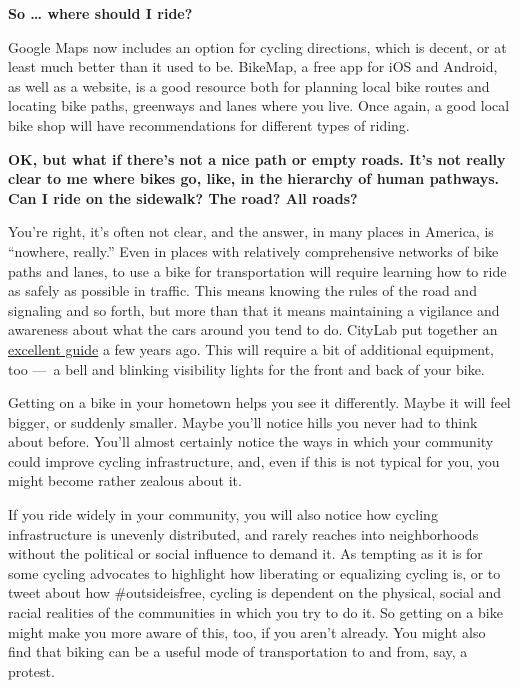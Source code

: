 \textbf{So \ldots{} where should I ride?}

Google Maps now includes an option for cycling directions, which is
decent, or at least much better than it used to be. BikeMap, a free app
for iOS and Android, as well as a website, is a good resource both for
planning local bike routes and locating bike paths, greenways and lanes
where you live. Once again, a good local bike shop will have
recommendations for different types of riding.

\textbf{OK, but what if there's not a nice path or empty roads. It's not
really clear to me where bikes go, like, in the hierarchy of human
pathways. Can I ride on the sidewalk? The road? All roads?}

You're right, it's often not clear, and the answer, in many places in
America, is ``nowhere, really.'' Even in places with relatively
comprehensive networks of bike paths and lanes, to use a bike for
transportation will require learning how to ride as safely as possible
in traffic. This means knowing the rules of the road and signaling and
so forth, but more than that it means maintaining a vigilance and
awareness about what the cars around you tend to do. CityLab put
together an
\href{https://www.citylab.com/life/2017/05/urban-cycling-how-to/526500/}{excellent
guide} a few years ago. This will require a bit of additional equipment,
too ---~a bell and blinking visibility lights for the front and back of
your bike.

Getting on a bike in your hometown helps you see it differently. Maybe
it will feel bigger, or suddenly smaller. Maybe you'll notice hills you
never had to think about before. You'll almost certainly notice the ways
in which your community could improve cycling infrastructure, and, even
if this is not typical for you, you might become rather zealous about
it.

If you ride widely in your community, you will also notice how cycling
infrastructure is unevenly distributed, and rarely reaches into
neighborhoods without the political or social influence to demand it. As
tempting as it is for some cycling advocates to highlight how liberating
or equalizing cycling is, or to tweet about how \#outsideisfree, cycling
is dependent on the physical, social and racial realities of the
communities in which you try to do it. So getting on a bike might make
you more aware of this, too, if you aren't already. You might also find
that biking can be a useful mode of transportation to and from, say, a
protest.

